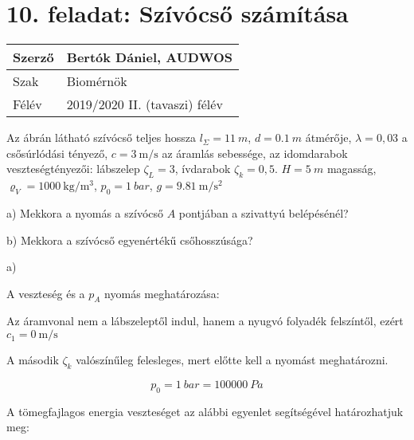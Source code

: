 \section*{10. feladat: Szívócső számítása}




\begin{tabular}{ | p{2cm} | p{14cm} | } 
	\hline
	Szerző & Bertók Dániel, AUDWOS \\ 
	\hline
	Szak & Biomérnök \\ 
	\hline
	Félév & 2019/2020 II. (tavaszi) félév \\ 
	\hline
\end{tabular}
\vspace{0.5cm}


\noindent Az ábrán látható szívócső teljes hossza $l_\Sigma= \SI{11}{m}$,
$d= \SI{0,1}{m}$ átmérője,
$\lambda= 0,03$ a csősúrlódási tényező,
$c= \SI{3}{\meter\per\second}$ az áramlás sebessége,
az idomdarabok veszteségtényezői:
lábszelep $\zeta_L= 3$, ívdarabok $\zeta_k= 0,5$.
$H= \SI{5}{m}$ magasság,
$\varrho_V= \SI{1000}{\kilogram\per\meter\cubed}$,
$p_0= \SI{1}{bar}$,
$g= \SI{9,81}{\meter\per\second\squared}$ 
\vspace{0.5cm}


\noindent a) Mekkora a nyomás a szívócső $A$ pontjában a szivattyú belépésénél?

\noindent b) Mekkora a szívócső egyenértékű csőhosszúsága?





\noindent\hrulefill

\pagebreak

\noindent a)

\noindent A veszteség és a $p_A$ nyomás meghatározása:

\noindent Az áramvonal nem a lábszeleptől indul, hanem a nyugvó folyadék felszíntől, ezért $c_1= \SI{0}{\meter\per\second}$

\noindent A második  $\zeta_k$ valószínűleg felesleges, mert előtte kell a nyomást meghatározni.

\begin{equation}
p_0=\SI{1}{bar}=\SI{100000}{Pa}
\end{equation}

A tömegfajlagos energia veszteséget az alábbi egyenlet segítségével határozhatjuk meg:

